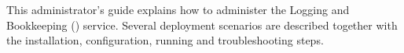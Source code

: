This administrator's guide explains how to administer the Logging and
Bookkeeping (\LB) service. Several deployment scenarios are described together
with the installation, configuration, running and troubleshooting steps.
